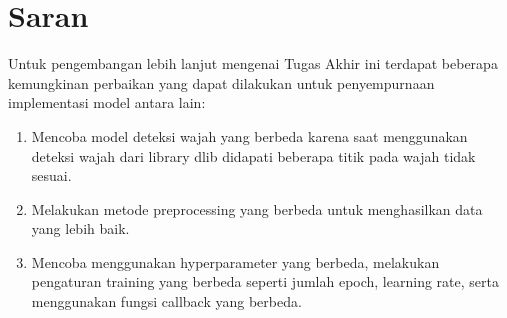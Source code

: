 \section{Saran}
\label{chap:saran}

Untuk pengembangan lebih lanjut mengenai Tugas Akhir ini terdapat beberapa
kemungkinan perbaikan yang dapat dilakukan untuk penyempurnaan implementasi
model antara lain:

\begin{enumerate}[nolistsep]

      \item Mencoba model deteksi wajah yang berbeda karena saat menggunakan deteksi wajah dari library dlib
            didapati beberapa titik pada wajah tidak sesuai.

      \item Melakukan metode preprocessing yang berbeda untuk menghasilkan data yang lebih baik.

      \item Mencoba menggunakan hyperparameter yang berbeda, melakukan pengaturan training yang berbeda seperti
            jumlah epoch, learning rate, serta menggunakan fungsi callback yang berbeda.

\end{enumerate}
